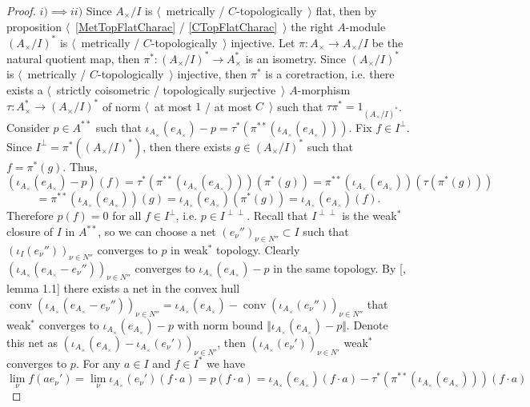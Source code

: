 \begin{proof} $i)$$\implies$$ ii)$  Since $A_\times /I$ is $\langle$~metrically / $C$-topologically~$\rangle$ flat, then by proposition $\langle$~\ref{MetTopFlatCharac} / \ref{CTopFlatCharac}~$\rangle$ the right $A$-module $(A_\times /I)^*$ is $\langle$~metrically / $C$-topologically~$\rangle$ injective. Let $\pi:A_\times \to A_\times /I$ be the natural quotient map, then $\pi^*:(A_\times /I)^*\to A_\times ^*$ is an isometry. Since $(A_\times /I)^*$ is $\langle$~metrically / $C$-topologically~$\rangle$ injective, then $\pi^*$ is a coretraction, i.e. there exists a $\langle$~strictly coisometric / topologically surjective~$\rangle$ $A$-morphism $\tau:A_\times ^*\to (A_\times /I)^*$ of norm $\langle$~at most $1$ / at most $C$~$\rangle$ such that $\tau\pi^*=1_{(A_\times /I)^*}$. Consider $p\in A^{**}$ such that $\iota_{A_\times }(e_{A_\times })-p=\tau^*(\pi^{**}(\iota_{A_\times }(e_{A_\times })))$. Fix $f\in I^\perp$. Since $I^\perp=\pi^*((A_\times /I)^*)$, then there exists $g\in (A_\times /I)^*$ such that $f=\pi^*(g)$. Thus,
$$
(\iota_{A_\times }(e_{A_\times })-p)(f)
=\tau^*(\pi^{**}(\iota_{A_\times }(e_{A_\times })))(\pi^*(g))
=\pi^{**}(\iota_{A_\times }(e_{A_\times }))(\tau(\pi^*(g)))
$$
$$
=\pi^{**}(\iota_{A_\times }(e_{A_\times }))(g)
=\iota_{A_\times }(e_{A_\times })(\pi^*(g))
=\iota_{A_\times }(e_{A_\times })(f).
$$
Therefore $p(f)=0$ for all $f\in I^\perp$, i.e. $p\in I^{\perp\perp}$. Recall that $I^{\perp\perp}$ is the weak${}^*$ closure of $I$ in $A^{**}$, so we can choose a net $(e_\nu'')_{\nu\in N''}\subset I$ such that $(\iota_I(e_\nu''))_{\nu\in N''}$ converges to $p$ in weak${}^*$ topology. Clearly $(\iota_{A_\times }(e_{A_\times }-e_\nu''))_{\nu\in N''}$ converges to $\iota_{A_\times }(e_{A_\times })-p$ in the same topology. By [\cite{PosAndApproxIdinBanAlg}, lemma 1.1] there exists a net in the convex hull $\operatorname{conv}(\iota_{A_\times }(e_{A_\times }-e_\nu''))_{\nu\in N''}=\iota_{A_\times }(e_{A_\times })-\operatorname{conv}(\iota_{A_\times }(e_\nu''))_{\nu\in N''}$ that weak${}^*$ converges to $\iota_{A_\times }(e_{A_\times })-p$ with norm bound $\Vert \iota_{A_\times }(e_{A_\times })-p\Vert$. Denote this net as $(\iota_{A_\times }(e_{A_\times })-\iota_{A_\times }(e_\nu'))_{\nu\in N'}$, then $(\iota_{A_\times }(e_\nu'))_{\nu\in N'}$ weak${}^*$ converges to $p$. For any $a\in I$ and $f\in I^*$ we have
$$
\lim_{\nu}f(ae_\nu')
=\lim_{\nu}\iota_{A_\times }(e_\nu')(f\cdot a)
=p(f\cdot a)
=\iota_{A_\times }(e_{A_\times })(f\cdot a)-\tau^*(\pi^{**}(\iota_{A_\times }(e_{A_\times })))(f\cdot a)
$$
$$
$$
\end{proof}

